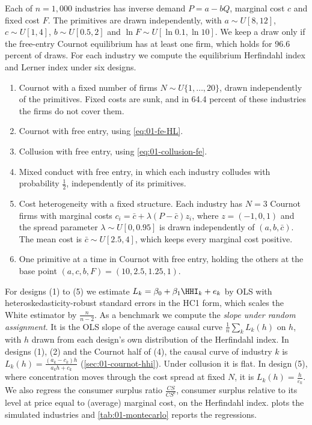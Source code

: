Each of $n = 1{,}000$ industries has inverse demand $P = a - bQ$, marginal cost $c$ and fixed cost $F$.
The primitives are drawn independently, with $a \sim U[8, 12]$, $c \sim U[1, 4]$, $b \sim U[0.5, 2]$ and
$\ln F \sim U[\ln 0.1, \ln 10]$. We keep a draw only if the free-entry Cournot equilibrium has at least
one firm, which holds for 96.6 percent of draws. For each industry we compute the equilibrium
Herfindahl index and Lerner index under six designs.
\begin{enumerate}[label=(\arabic*)]
\item Cournot with a fixed number of firms $N \sim U\{1, \dots, 20\}$, drawn independently of the
primitives. Fixed costs are sunk, and in 64.4 percent of these industries the firms do not cover them.
\item Cournot with free entry, using \eqref{eq:01-fe-HL}.
\item Collusion with free entry, using \eqref{eq:01-collusion-fe}.
\item Mixed conduct with free entry, in which each industry colludes with probability $\frac{1}{2}$,
independently of its primitives.
\item Cost heterogeneity with a fixed structure. Each industry has $N = 3$ Cournot firms with marginal
costs $c_i = \bar c + \lambda (P - \bar c) z_i$, where $z = (-1, 0, 1)$ and the spread parameter
$\lambda \sim U[0, 0.95]$ is drawn independently of $(a, b, \bar c)$. The mean cost is
$\bar c \sim U[2.5, 4]$, which keeps every marginal cost positive.
\item One primitive at a time in Cournot with free entry, holding the others at the base point
$(a, c, b, F) = (10, 2.5, 1.25, 1)$.
\end{enumerate}
For designs (1) to (5) we estimate $L_k = \beta_0 + \beta_1 \HHI_k + e_k$ by OLS with
heteroskedasticity-robust standard errors in the HC1 form, which scales the White estimator by
$\frac{n}{n - 2}$. As a benchmark we compute the \emph{slope under random assignment}. It is the OLS slope of
the average causal curve $\frac{1}{n}\sum_k L_k(h)$ on $h$, with $h$ drawn from each design's own
distribution of the Herfindahl index. In designs (1), (2) and the Cournot half of (4), the causal curve of
industry $k$ is $L_k(h) = \frac{(a_k - c_k) h}{a_k h + c_k}$ (\cref{sec:01-cournot-hhi}). Under collusion it
is flat. In design (5), where concentration moves through the cost spread at fixed $N$, it is
$L_k(h) = \frac{h}{\varepsilon_k}$.
We also regress the consumer surplus ratio $\frac{CS}{CS^c}$, consumer surplus relative to its level at
price equal to (average) marginal cost, on the Herfindahl index.  plots the
simulated industries and \cref{tab:01-montecarlo} reports the regressions.

